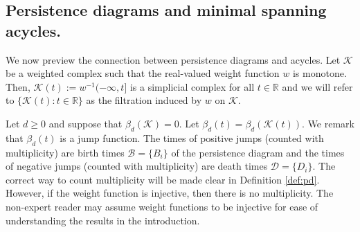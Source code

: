 \documentclass[12pt]{amsart}
\newcommand{\gt}[1]{\textcolor{blue}{#1}}
\renewcommand{\gt}[1]{#1}
\numberwithin{equation}{section}
\numberwithin{theorem}{section}
\newcommand{\Real}{\mathbb R}
\newcommand{\1}{\mathbf{1}}
\def\K{\mathcal{K}}
\begin{document}
\subsection{Persistence diagrams and minimal spanning acycles.}
\label{ssec:pd-msa}
%
We now preview the connection between persistence diagrams and acycles.  \gt{Let $\K$ be a weighted complex such that the real-valued weight function $w$ is monotone. Then, $\K(t) := w^{-1}(-\infty,t]$ is a simplicial complex for all $t \in \Real$ and we will refer to $\{\K(t): t \in \Real\}$ as the filtration induced by $w$ on $\K.$}

Let $d \geq 0$ and suppose that $\beta_d(\K) = 0$. Let $\beta_d(t) = \beta_d(\K(t)).$ We remark that $\beta_d(t)$ is a jump function. The times of positive jumps (counted with multiplicity) are birth times $\mathcal{B} = \{B_i\}$ of the persistence diagram and the times of negative jumps (counted with multiplicity) are death times $\mathcal{D} = \{D_i\}.$ The correct way to count multiplicity will be made clear in Definition \ref{def:pd}. However, if the weight function is injective, then there is no multiplicity. The non-expert reader may assume weight functions to be injective for ease of understanding the results in the introduction.
\end{document}
